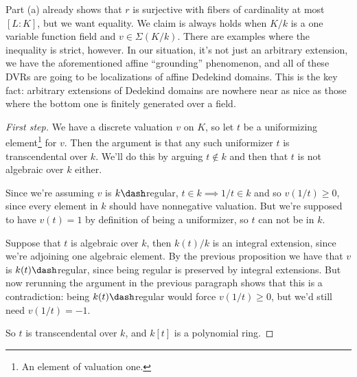 \begin{remark}

Part (a) already shows that \(r\) is surjective with fibers of
cardinality at most \([L: K]\), but we want equality. We claim is always
holds when \(K/k\) is a one variable function field and
\(v\in \Sigma(K/k)\). There are examples where the inequality is strict,
however. In our situation, it's not just an arbitrary extension, we have
the aforementioned affine ``grounding'' phenomenon, and all of these
DVRs are going to be localizations of affine Dedekind domains. This is
the key fact: arbitrary extensions of Dedekind domains are nowhere near
as nice as those where the bottom one is finitely generated over a
field.

\end{remark}

\begin{proof}[First step]

We have a discrete valuation \(v\) on \(K\), so let \(t\) be a
uniformizing element\footnote{An element of valuation one.} for \(v\).
Then the argument is that any such uniformizer \(t\) is transcendental
over \(k\). We'll do this by arguing \(t\not\in k\) and then that \(t\)
is not algebraic over \(k\) either.

Since we're assuming \(v\) is \(k\dash\)regular,
\(t\in k \implies 1/t\in k\) and so \(v(1/t) \geq 0\), since every
element in \(k\) should have nonnegative valuation. But we're supposed
to have \(v(t) = 1\) by definition of being a uniformizer, so \(t\) can
not be in \(k\).

Suppose that \(t\) is algebraic over \(k\), then \(k(t)/k\) is an
integral extension, since we're adjoining one algebraic element. By the
previous proposition we have that \(v\) is \(k(t)\dash\)regular, since
being regular is preserved by integral extensions. But now rerunning the
argument in the previous paragraph shows that this is a contradiction:
being \(k(t)\dash\)regular would force \(v(1/t) \geq 0\), but we'd still
need \(v(1/t) = -1\).

So \(t\) is transcendental over \(k\), and \(k[t]\) is a polynomial
ring.

\end{proof}

